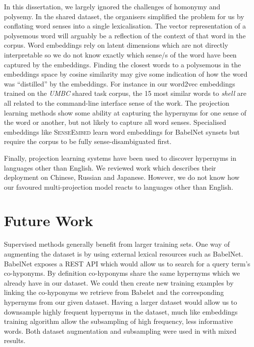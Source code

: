 In this dissertation, we largely ignored the challenges of homonymy and polysemy. In the shared dataset, the organisers simplified the problem for us by conflating word senses into a single lexicalisation.   The vector representation of a polysemous word will arguably be a reflection of the context of that word in the corpus.  Word embeddings rely on latent dimensions which are not directly interpretable so we do not know exactly which sense/s of the word have been captured by the embeddings.  Finding the closest words to a polysemous in the embeddings space by cosine similarity may give some indication of how the word was ``distilled'' by the embeddings.  For instance in our word2vec embeddings trained on the \textit{UMBC} shared task corpus, the 15 most similar words to \textit{shell} are all related to the command-line interface sense of the work.  The projection learning methods show some ability at capturing the hypernyms for one sense of the word or another, but not likely to capture all word senses.  Specialised embeddings like \textsc{SenseEmbed} \citep{iacobacci2015sensembed} learn word embeddings for BabelNet \citep{navigli2012babelnet} synsets but require the corpus to be fully sense-disambiguated first.

Finally, projection learning systems have been used to discover hypernyms in languages other than English.  We reviewed work which describes their deployment on Chinese, Russian and Japanese.  However, we do not know how our favoured multi-projection model reacts to languages other than English.  

\section{Future Work}
Supervised methods generally benefit from larger training sets.  One way of augmenting the dataset is by using external lexical resources such as BabelNet.  BabelNet exposes a REST API which would allow us to search for a query term's co-hyponyms.  By definition co-hyponyms share the same hypernyms which we already have in our dataset.  We could then create new training examples by linking the co-hyponyms we retrieve from Babelet and the corresponding hypernyms from our given dataset.  Having a larger dataset would allow us to downsample highly frequent hypernyms in the dataset, much like embeddings training algorithm allow the subsampling of high frequency, less informative words.  Both dataset augmentation and subsampling were used in \cite{bernier2018crim} with mixed results.

